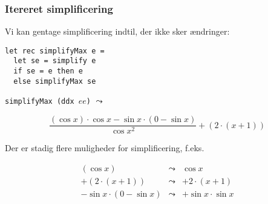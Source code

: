 \documentclass{beamer}
\begin{document}
\begin{frame}[fragile=singleslide]
\frametitle{Itereret simplificering}

Vi kan gentage simplificering indtil, der ikke sker ændringer:

\begin{verbatim}
let rec simplifyMax e =
  let se = simplify e
  if se = e then e
  else simplifyMax se  
\end{verbatim}

\texttt{simplifyMax (ddx $ee$)} $\leadsto$

\[
\frac{(\cos x)\cdot \cos x-\sin x\cdot (0-\sin x)}{\cos x^2}+(2\cdot (x+1))
\]


Der er stadig flere muligheder for simplificering, f.eks.

\[
\begin{array}{ccc}
  (\cos x) & \leadsto & \cos x\\
+ (2\cdot (x+1)) & \leadsto & + 2\cdot (x+1)\\
- \sin x\cdot (0-\sin x) & \leadsto & + \sin x \cdot \sin x
\end{array}
\]

\end{frame}
\end{document}
